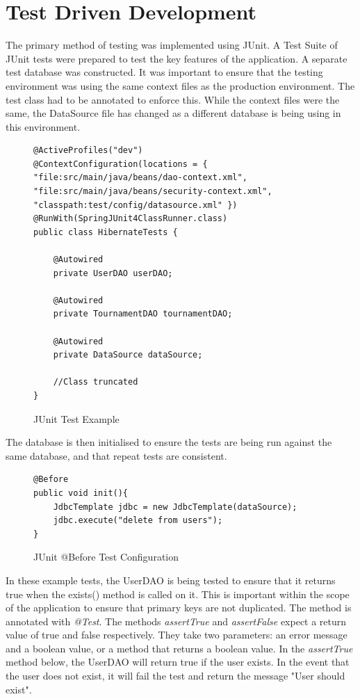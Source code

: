 \section{Test Driven Development}

The primary method of testing was implemented using JUnit. A Test Suite of JUnit tests were prepared to test the key features of the application. A separate test database was constructed. It was important to ensure that the testing environment was using the same context files as the production environment. The test class had to be annotated to enforce this. While the context files were the same, the DataSource file has changed as a different database is being using in this environment.


\begin{figure}[H]
\begin{lstlisting}
@ActiveProfiles("dev")
@ContextConfiguration(locations = { "file:src/main/java/beans/dao-context.xml",
"file:src/main/java/beans/security-context.xml",
"classpath:test/config/datasource.xml" })
@RunWith(SpringJUnit4ClassRunner.class)
public class HibernateTests {
	
	@Autowired
	private UserDAO userDAO;
	
	@Autowired
	private TournamentDAO tournamentDAO;
	
	@Autowired
	private DataSource dataSource;
	
	//Class truncated 
}

\end{lstlisting}
\caption{JUnit Test Example}
\end{figure}

The database is then initialised to ensure the tests are being run against the same database, and that repeat tests are consistent.

\begin{figure}[H]
\begin{lstlisting}
@Before
public void init(){
	JdbcTemplate jdbc = new JdbcTemplate(dataSource);
	jdbc.execute("delete from users"); 
}
\end{lstlisting}
\caption{JUnit @Before Test Configuration}
\end{figure}

In these example tests, the UserDAO is being tested to ensure that it returns true when the exists() method is called on it. This is important within the scope of the application to ensure that primary keys are not duplicated. The method is annotated with \textit{@Test}. The methods \textit{assertTrue} and \textit{assertFalse} expect a return value of true and false respectively. They take two parameters: an error message and a boolean value, or a method that returns a boolean value. In the \textit{assertTrue} method below, the UserDAO will return true if the user exists. In the event that the user does not exist, it will fail the test and return the message "User should exist".\newline 

